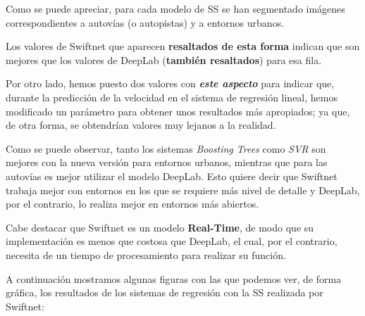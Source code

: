 Como se puede apreciar, para cada modelo de \ac{SS} se han segmentado imágenes correspondientes a autovías (o autopistas) y a entornos urbanos.

Los valores de Swiftnet que aparecen \textbf{resaltados de esta forma} indican que son mejores que los valores de DeepLab (\textbf{también resaltados}) para esa fila.

Por otro lado, hemos puesto dos valores con \textit{\textbf{este aspecto}} para indicar que, durante la predicción de la velocidad en el sistema de regresión lineal, hemos modificado un parámetro para obtener unos resultados más apropiados; ya que, de otra forma, se obtendrían valores muy lejanos a la realidad.

Como se puede observar, tanto los sistemas \textit{Boosting Trees} como \textit{\ac{SVR}} son mejores con la nueva versión para entornos urbanos, mientras que para las autovías es mejor utilizar el modelo DeepLab. Esto quiere decir que Swiftnet trabaja mejor con entornos en los que se requiere más nivel de detalle y DeepLab, por el contrario, lo realiza mejor en entornos más abiertos.

Cabe destacar que Swiftnet \cite{swiftnet} es un modelo \textbf{Real-Time}, de modo que su implementación es menos que costosa que DeepLab, el cual, por el contrario, necesita de un tiempo de procesamiento para realizar su función.

A continuación mostramos algunas figuras con las que podemos ver, de forma gráfica, los resultados de los sistemas de regresión con la \ac{SS} realizada por Swiftnet:


